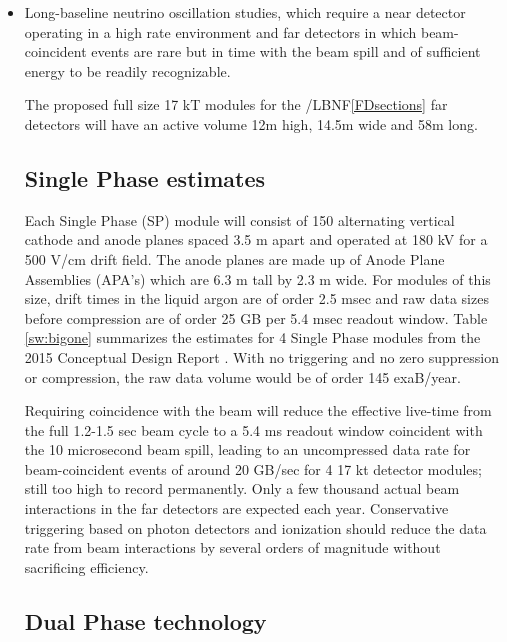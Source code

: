 \begin{itemize}
\item Long-baseline neutrino oscillation studies, which require a near detector operating in a high rate environment and far detectors in which beam-coincident events are rare but in time with the beam spill and of sufficient energy to be readily recognizable.  

The proposed  full size 17 kT modules for the  /LBNF\ref{FDsections} far detectors will  have an active volume 12m high, 14.5m wide and 58m long. 

\subsection{Single Phase estimates}
 Each Single Phase (SP) module will consist of
150 alternating vertical cathode and anode planes  spaced 3.5 m apart and operated at 180 kV for a 500 V/cm drift field.  The anode planes are made up of Anode Plane Assemblies  (APA's) which are 6.3 m tall by 2.3 m wide. %
For modules of this size, drift times in the liquid argon are of order 2.5 msec and raw data sizes before compression are of order 25 GB per 5.4 msec readout window. Table \ref{sw:bigone} summarizes the estimates for 4 Single Phase modules from the 2015 Conceptual Design Report \cite{cdr-annex-rates}.  With no triggering and no zero suppression or compression, the raw data volume would be of order 145 exaB/year. 

Requiring  coincidence with the  beam will reduce the effective live-time from the full 1.2-1.5 sec beam cycle to a 5.4 ms readout window coincident with the 10 microsecond beam spill, leading to an uncompressed data rate for beam-coincident events of around 20 GB/sec for 4 17 kt detector modules;  still too high to record permanently.
Only a few thousand actual beam interactions in the far detectors are expected each year.  Conservative triggering based on photon detectors and ionization should reduce the data rate from beam interactions by several orders of magnitude without sacrificing efficiency.

\subsection{Dual Phase technology}


\end{itemize}
